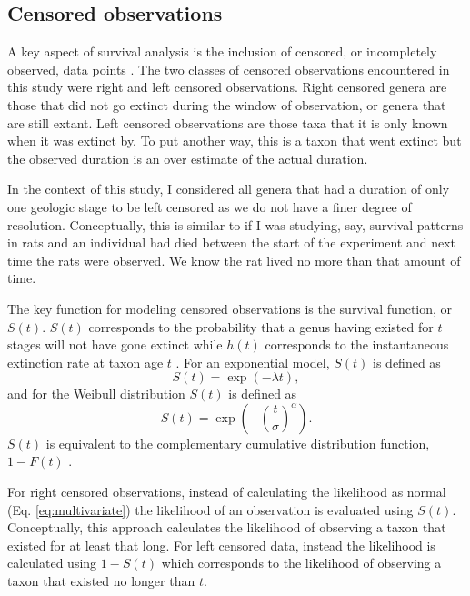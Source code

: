 \documentclass[12pt,letterpaper]{article}
\begin{document}
\subsection{Censored observations}
A key aspect of survival analysis is the inclusion of censored, or incompletely observed, data points \citep{Ibrahim2001,Klein2003}. The two classes of censored observations encountered in this study were right and left censored observations. Right censored genera are those that did not go extinct during the window of observation, or genera that are still extant. Left censored observations are those taxa that it is only known when it was extinct by. To put another way, this is a taxon that went extinct but the observed duration is an over estimate of the actual duration. 

In the context of this study, I considered all genera that had a duration of only one geologic stage to be left censored as we do not have a finer degree of resolution. Conceptually, this is similar to if I was studying, say, survival patterns in rats and an individual had died between the start of the experiment and next time the rats were observed. We know the rat lived no more than that amount of time.

The key function for modeling censored observations is the survival function, or \(S(t)\). \(S(t)\) corresponds to the probability that a genus having existed for \(t\) stages will not have gone extinct while \(h(t)\) corresponds to the instantaneous extinction rate at taxon age \(t\) \cite{Klein2003}. For an exponential model, \(S(t)\) is defined as
\begin{equation}
  S(t) = \exp(-\lambda t),
  \label{eq:exp_surv}
\end{equation}
and for the Weibull distribution \(S(t)\) is defined as
\begin{equation}
  S(t) = \exp\left(-\left(\frac{t}{\sigma}\right)^{\alpha}\right).
  \label{eq:wei_surv}
\end{equation}
\(S(t)\) is equivalent to the complementary cumulative distribution function, \(1 - F(t)\) \citep{Klein2003}. 

For right censored observations, instead of calculating the likelihood as normal (Eq. \ref{eq:multivariate}) the likelihood of an observation is evaluated using \(S(t)\). Conceptually, this approach calculates the likelihood of observing a taxon that existed for at least that long. For left censored data, instead the likelihood is calculated using \(1 - S(t)\) which corresponds to the likelihood of observing a taxon that existed no longer than \(t\).
\end{document}
